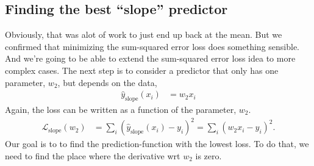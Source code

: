 \documentclass{article}
\newcommand{\yh}{\hat{y}}
\newcommand{\bracket}[3]{\left#1 #3 \right#2}
\renewcommand{\b}{\bracket{(}{)}}
\renewcommand{\L}{\mathcal{L}}
\begin{document}
\subsection{Finding the best ``slope'' predictor}
Obviously, that was alot of work to just end up back at the mean.
But we confirmed that minimizing the sum-squared error loss does something sensible.
And we're going to be able to extend the sum-squared error loss idea to more complex cases.
The next step is to consider a predictor that only has one parameter, $w_2$, but depends on the data,
\begin{align}
  \yh_\text{slope}(x_i) &= w_2 x_i
\end{align}
Again, the loss can be written as a function of the parameter, $w_2$.
\begin{align}
  \L_\text{slope}(w_2) &= \sum_i \b{\yh_\text{slope}(x_i) - y_i}^2 =  \sum_i \b{w_2 x_i - y_i}^2.
\end{align} 
Our goal is to to find the prediction-function with the lowest loss.
To do that, we need to find the place where the derivative wrt $w_2$ is zero.
\end{document}
